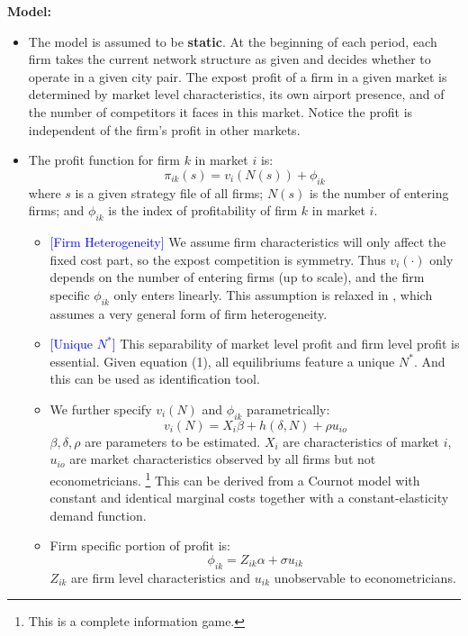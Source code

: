 \documentclass{book}
\theoremstyle{plain}
\theoremstyle{definition}
\begin{document}
\vspace{1em}
\noindent
\textbf{Model:}
\begin{itemize}
	\item The model is assumed to be \textbf{static}. At the beginning of each period, each firm takes the current network structure as given and decides whether to operate in a given city pair. 
	The expost profit of a firm in a given market is determined by market level characteristics, its own airport presence, and of the number of competitors it faces in this market.
	Notice the profit is independent of the firm's profit in other markets.

	\item The profit function for firm $k$ in market $i$ is:
	\[\pi_{ik}(s) = v_i(N(s))+\phi_{ik} \tag{1}\]
	where $s$ is a given strategy file of all firms; $N(s)$ is the number of entering firms; and $\phi_{ik}$ is the index of profitability of firm $k$ in market $i$.
	\begin{itemize}
		\item \textcolor{blue}{[Firm Heterogeneity]}
		We assume firm characteristics will only affect the fixed cost part, so the expost competition is symmetry. Thus $v_i(\cdot)$ only depends on the number of entering firms (up to scale), and the firm specific $\phi_{ik}$ only enters linearly.
		This assumption is relaxed in \cite{Ciliberto:2009hy}, which assumes a very general form of firm heterogeneity.

		\item \textcolor{blue}{[Unique $N^*$]} This separability of market level profit and firm level profit is essential.
		Given equation (1), all equilibriums feature a unique $N^*$. And this can be used as identification tool.

		\item We further specify $v_i(N)$ and $\phi_{ik}$ parametrically:
		\[v_i(N)=X_i\beta+h(\delta,N)+\rho u_{io} \tag{2}\]
		$\beta,\delta,\rho$ are parameters to be estimated. $X_i$ are characteristics of market $i$, $u_{io}$ are market characteristics observed by all firms but not econometricians.
		\footnote{This is a complete information game.}
		This can be derived from a Cournot model with constant and identical marginal costs together with a constant-elasticity demand function.

		\item Firm specific portion of profit is:
		\[\phi_{ik}=Z_{ik}\alpha+\sigma u_{ik}\]
		$Z_{ik}$ are firm level characteristics and $u_{ik}$ unobservable to econometricians.


\end{itemize}
\end{itemize}
\end{document}

